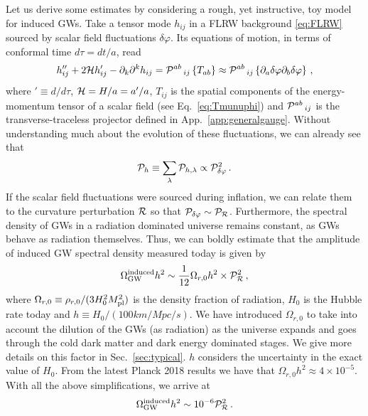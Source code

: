 \documentclass[a4paper,11pt]{article}
\numberwithin{equation}{section}
\begin{document}
Let us derive some estimates by considering a rough, yet instructive, toy model for induced GWs. Take a tensor mode $h_{ij}$ in a FLRW background \eqref{eq:FLRW} sourced by scalar field fluctuations $\delta\varphi$. Its equations of motion, in terms of conformal time $d\tau=dt/a$, read
\begin{equation}\label{eq:eom}
h''_{ij}+2{\cal H}h'_{ij}-\partial_k\partial^k h_{ij}={\cal P}^{ab}\,_{ij}\left\{T_{ab}\right\}\approx {\cal P}^{ab}\,_{ij}\left\{\partial_a\delta\varphi\partial_b\delta\varphi\right\}\,,
\end{equation}
where $'\equiv d/d\tau$, ${\cal H}=H/a=a'/a$, $T_{ij}$ is the spatial components of the energy-momentum tensor of a scalar field (see Eq.~\eqref{eq:Tmunuphi}) and ${\cal P}^{ab}\,_{ij}$ is the transverse-traceless projector defined in App.~\ref{app:generalgauge}. Without understanding much about the evolution of these fluctuations, we can already see that 
\begin{equation}
{\cal P}_{h}\equiv\sum_\lambda{\cal P}_{h,\lambda}\propto {\cal P}^2_{\delta\varphi}\,.
\end{equation}
If the scalar field fluctuations were sourced during inflation, we can relate them to the curvature perturbation ${\cal R}$ so that ${\cal P}_{\delta\varphi}\sim {\cal P}_{\cal R}$. Furthermore, the spectral density of GWs in a radiation dominated universe remains constant, as GWs behave as radiation themselves. Thus, we can boldly estimate that the amplitude of induced GW spectral density measured today is given by
\begin{equation}\label{eq:spectraldensityestimate}
\Omega^{\rm induced}_{\rm GW}h^2\sim\frac{1}{12}\Omega_{r,0} h^2\times{\cal P}^2_{\cal R}\,,
\end{equation}
where $\Omega_{r,0}\equiv \rho_{r,0}/(3H_0^2M_{\rm pl}^2)$ is the density fraction of radiation, $H_0$ is the Hubble rate today and $h\equiv H_0/(100 km/Mpc/s)$. We have introduced $\Omega_{r,0}$ to take into account the dilution of the GWs (as radiation) as the universe expands and goes through the cold dark matter and dark energy dominated stages. We give more details on this factor in Sec.~\ref{sec:typical}. $h$ considers the uncertainty in the exact value of $H_0$. From the latest Planck 2018 results \cite{Aghanim:2018eyx} we have that $\Omega_{r,0} h^2\approx 4\times 10^{-5}$. With all the above simplifications, we arrive at
\begin{equation}\label{eq:spectraldensityestimate2}
\Omega^{\rm induced}_{\rm GW}h^2\sim 10^{-6}{\cal P}^2_{\cal R}\,.
\end{equation}
\end{document}
